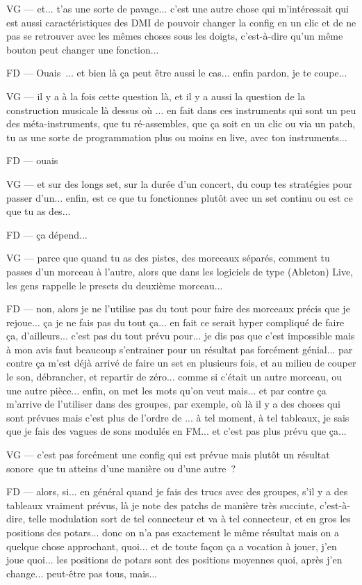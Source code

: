 VG — et... t'as une sorte de pavage... c'est une autre chose qui m'intéressait qui est aussi caractéristiques des DMI de pouvoir changer la config en un clic et de ne pas se retrouver avec les mêmes choses sous les doigts, c'est-à-dire qu'un même bouton peut changer une fonction... 

FD — Ouais ... et bien là ça peut être aussi le cas... enfin pardon, je te coupe... 

VG — il y a à la fois cette question là, et il y a aussi la question de la construction musicale là dessus où ... en fait dans ces instruments qui sont un peu des méta-instruments, que tu ré-assembles, que ça soit en un clic ou via un patch, tu as une sorte de programmation plus ou moins en live, avec ton instruments... 

FD — ouais 

VG — et sur des longs set, sur la durée d'un concert, du coup tes stratégies pour passer d'un... enfin, est ce que tu fonctionnes plutôt avec un set continu ou est ce que tu as des... 

FD — ça dépend... 

VG — parce que quand tu as des pistes, des morceaux séparés, comment tu passes d'un morceau à l'autre, alors que dans les logiciels de type (Ableton) Live, les gens rappelle le presets du deuxième morceau... 

FD — non, alors je ne l'utilise pas du tout pour faire des morceaux précis que je rejoue... ça je ne fais pas du tout ça... en fait ce serait hyper compliqué de faire ça, d'ailleurs... c'est pas du tout prévu pour... je dis pas que c'est impossible mais à mon avis faut beaucoup s'entrainer pour un résultat pas forcément génial... par contre ça m'est déjà arrivé de faire un set en plusieurs fois, et au milieu de couper le son, débrancher, et repartir de zéro... comme si c'était un autre morceau, ou une autre pièce... enfin, on met les mots qu'on veut mais... et par contre ça m'arrive de l'utiliser dans des groupes, par exemple, où là il y a des choses qui sont prévues mais c'est plus de l'ordre de ... à tel moment, à tel tableaux, je sais que je fais des vagues de sons modulés en FM... et c'est pas plus prévu que ça... 

VG — c'est pas forcément une config qui est prévue mais plutôt un résultat sonore que tu atteins d'une manière ou d'une autre ? 

FD — alors, si... en général quand je fais des trucs avec des groupes, s'il y a des tableaux vraiment prévus, là je note des patchs de manière très succinte, c'est-à-dire, telle modulation sort de tel connecteur et va à tel connecteur, et en gros les positions des potars... donc on n'a pas exactement le même résultat mais on a quelque chose approchant, quoi... et de toute façon ça a vocation à jouer, j'en joue quoi... les positions de potars sont des positions moyennes quoi, après j'en change... peut-être pas tous, mais... 

